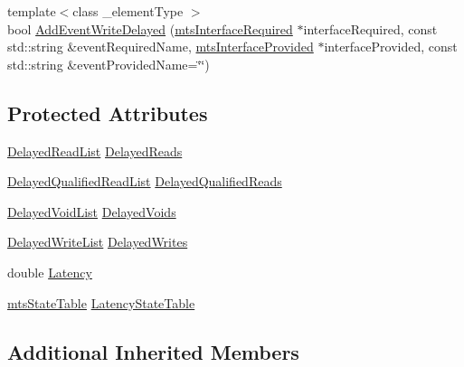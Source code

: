 \begin{DoxyCompactItemize}
\item 
{\footnotesize template$<$class \+\_\+element\+Type $>$ }\\bool \hyperlink{classmts_component_add_latency_a49448643a64f9fe5572df35852df3846}{Add\+Event\+Write\+Delayed} (\hyperlink{classmts_interface_required}{mts\+Interface\+Required} $\ast$interface\+Required, const std\+::string \&event\+Required\+Name, \hyperlink{classmts_interface_provided}{mts\+Interface\+Provided} $\ast$interface\+Provided, const std\+::string \&event\+Provided\+Name=\char`\"{}\char`\"{})
\end{DoxyCompactItemize}
\subsection*{Protected Attributes}
\begin{DoxyCompactItemize}
\item 
\hyperlink{classmts_component_add_latency_a527c29b91f407598cb31a8113d453610}{Delayed\+Read\+List} \hyperlink{classmts_component_add_latency_afca7e020994bba8b9672a34d1a75c5e6}{Delayed\+Reads}
\item 
\hyperlink{classmts_component_add_latency_a00e005acc3d0af37d43abee413e92d1e}{Delayed\+Qualified\+Read\+List} \hyperlink{classmts_component_add_latency_aba7fcf1beb1dfda8f5bc34b3e6c0d3c5}{Delayed\+Qualified\+Reads}
\item 
\hyperlink{classmts_component_add_latency_a693394372f8f73601e8f46ab5a5a1780}{Delayed\+Void\+List} \hyperlink{classmts_component_add_latency_a68571be7ff2288ac2e8ecd534c521eec}{Delayed\+Voids}
\item 
\hyperlink{classmts_component_add_latency_a050cbf3819eb668c8098a78257e22236}{Delayed\+Write\+List} \hyperlink{classmts_component_add_latency_af9d25ccc41677dbf2b56070c803467bd}{Delayed\+Writes}
\item 
double \hyperlink{classmts_component_add_latency_a39ff64ef2a5151a991f7173613136747}{Latency}
\item 
\hyperlink{classmts_state_table}{mts\+State\+Table} \hyperlink{classmts_component_add_latency_a41d4fcc2b22bd8bb53b2a99159f7b667}{Latency\+State\+Table}
\end{DoxyCompactItemize}
\subsection*{Additional Inherited Members}


